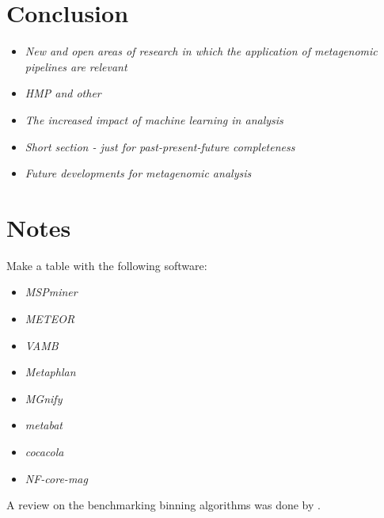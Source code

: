 \documentclass{article}
\begin{document}
\section{Conclusion}
\begin{itemize}
	\item \emph{New and open areas of research in which the application of metagenomic pipelines are relevant}
	\item \emph{HMP and other }
	\item \emph{The increased impact of machine learning in analysis}
	\item \emph{Short section - just for past-present-future completeness}
	\item \emph{Future developments for metagenomic analysis}
\end{itemize}

\section{Notes}
Make a table with the following software:
\begin{itemize}
	\item \emph{MSPminer}
	\item \emph{METEOR}
	\item \emph{VAMB}
	\item \emph{Metaphlan}
	\item \emph{MGnify}
	\item \emph{metabat}
	\item \emph{cocacola}
	\item \emph{NF-core-mag}
\end{itemize}
A review on the benchmarking binning algorithms was done by .


\end{document}
